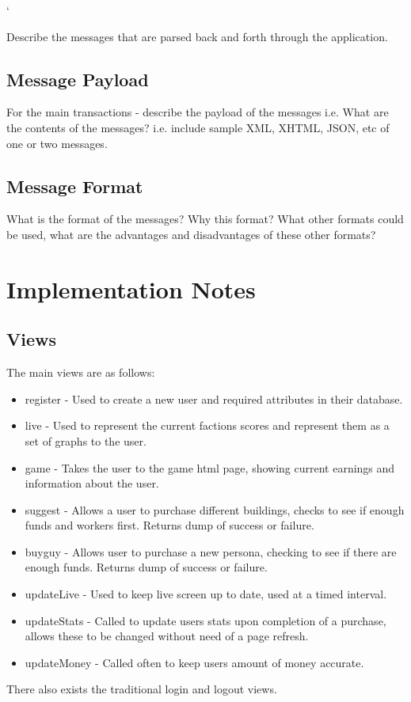 `\documentclass{sig-alt-release2}
\begin{document}
Describe the messages that are parsed back and forth through the application.

\subsection{Message Payload}

For the main transactions - describe the payload of the messages 
i.e. What are the contents of the messages? i.e. include sample XML, XHTML, JSON, etc of one or two messages.

\subsection{Message Format}

What is the format of the messages? 
Why this format? 
What other formats could be used, what are the advantages and disadvantages of these other formats?

\section{Implementation Notes}

\subsection{Views}

The main views are as follows:
\begin{itemize}
\item register - Used to create a new user and required attributes in their database.
\item live - Used to represent the current factions scores and represent them as a set of graphs to the user.
\item game - Takes the user to the game html page, showing current earnings and information about the user.
\item suggest - Allows a user to purchase different buildings, checks to see if enough funds and workers first. Returns dump of success or failure.
\item buyguy - Allows user to purchase a new persona, checking to see if there are enough funds. Returns dump of success or failure.
\item updateLive - Used to keep live screen up to date, used at a timed interval.
\item updateStats - Called to update users stats upon completion of a purchase, allows these to be changed without need of a page refresh.
\item updateMoney - Called often to keep users amount of money accurate.
\end{itemize}
There also exists the traditional login and logout views.
\end{document}
